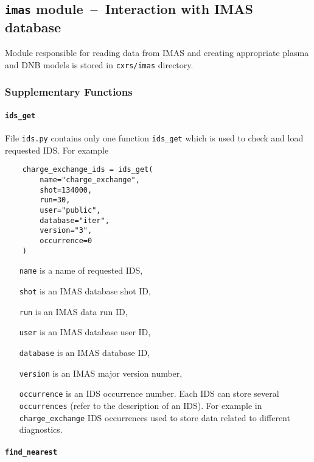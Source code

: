 \documentclass[../main.tex]{subfiles}
\begin{document}
\subsection{\texttt{imas} module~--~Interaction with IMAS database}%
\label{sec:reading_from_imas}

Module responsible for reading data from IMAS and creating appropriate plasma and DNB models is stored in \texttt{cxrs\//imas} directory.

\subsubsection{Supplementary Functions}%
\label{sec:imas_supp}

\paragraph{\texttt{ids\_get}}%
\label{par:ids_get}

File \texttt{ids.py} contains only one function \texttt{ids\_get} which is used to check and load requested IDS. For example

\begin{verbatim}
    charge_exchange_ids = ids_get(
        name="charge_exchange",
        shot=134000,
        run=30,
        user="public",
        database="iter",
        version="3",
        occurrence=0
    )
\end{verbatim}

\begin{itemize}[align=left]
    \item[\texttt{name}] is a name of requested IDS,
    \item[\texttt{shot}] is an IMAS database shot ID,
    \item[\texttt{run}] is an IMAS data run ID,
    \item[\texttt{user}] is an IMAS database user ID,
    \item[\texttt{database}] is an IMAS database ID,
    \item[\texttt{version}] is an IMAS major version number,
    \item[\texttt{occurrence}] is an IDS occurrence number. Each IDS can store several \texttt{occurrences} (refer to the description of an IDS). For example in \texttt{charge\_exchange} IDS occurrences used to store data related to different diagnostics.
\end{itemize}

\paragraph{\texttt{find\_nearest}}%
\label{par:find_nearest}
\end{document}
